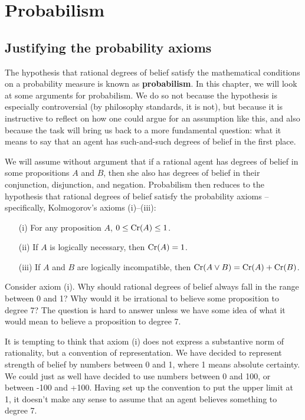 \chapter{Probabilism}\label{ch:probabilism}


\section{Justifying the probability axioms}

The hypothesis that rational degrees of belief satisfy the
mathematical conditions on a probability measure is known as
\textbf{probabilism}. In this chapter, we will look at some arguments
for probabilism. We do so not because the hypothesis is especially
controversial (by philosophy standards, it is not), but because it is
instructive to reflect on how one could argue for an assumption like
this, and also because the task will bring us back to a more
fundamental question: what it means to say that an agent has
such-and-such degrees of belief in the first place.

We will assume without argument that if a rational agent has degrees
of belief in some propositions $A$ and $B$, then she also has degrees
of belief in their conjunction, disjunction, and negation. Probabilism
then reduces to the hypothesis that rational degrees of belief satisfy
the probability axioms -- specifically, Kolmogorov's axioms (i)--(iii):
\begin{itemize}
\itemsep0em 
\item[(i)] For any proposition $A$, $0 \leq \text{Cr}(A) \leq 1$.
\item[(ii)] If $A$ is logically necessary, then $\text{Cr}(A) = 1$.
\item[(iii)] If $A$ and $B$ are logically incompatible, then $\text{Cr}(A \lor B) = \text{Cr}(A) + \text{Cr}(B)$.
\end{itemize}

Consider axiom (i). Why should rational degrees of belief always fall
in the range between 0 and 1? Why would it be irrational to believe
some proposition to degree 7? The question is hard to answer unless we
have some idea of what it would mean to believe a proposition to
degree 7.

It is tempting to think that axiom (i) does not express a substantive
norm of rationality, but a convention of representation. We have
decided to represent strength of belief by numbers between 0 and 1,
where 1 means absolute certainty. We could just as well have decided
to use numbers between 0 and 100, or between -100 and +100. Having set
up the convention to put the upper limit at 1, it doesn't make any
sense to assume that an agent believes something to degree 7.

